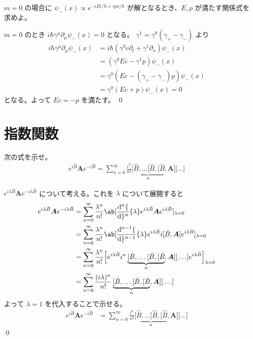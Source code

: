 \documentclass[uplatex,dvipdfmx,a4paper,11pt]{jlreq}
\makeatletter
\newcommand{\BB}{\bm{B}}
\renewcommand{\AA}{\hat{A}}
\renewcommand{\BB}{\hat{B}}
\renewcommand{\AA}{\bm{A}}
\numberwithin{equation}{section}
\theoremstyle{definition}
\renewenvironment{proof}[1][\proofname]{\par
  \normalfont
  \topsep6\p@\@plus6\p@ \trivlist
  \item[\hskip\labelsep{\bfseries #1}\@addpunct{\bfseries}]\ignorespaces\quad\par
}{%
  \qed\endtrivlist\@endpefalse
}
\renewcommand\proofname{証明}
\makeatother
\begin{document}
\begin{problem}
$m = 0$ の場合に $\psi_-(x) \propto e^{-iEt/\hbar+ipx/\hbar}$ が解となるとき、$E, p$ が満たす関係式を求めよ。
\end{problem}
\begin{proof}
  $m = 0$ のとき $i\hbar\gamma^\mu\partial_\mu\psi_-(x) = 0$ となる。 $\gamma^1 = \gamma^0(\gamma_+ - \gamma_-)$ より
  \begin{align}
    i\hbar\gamma^\mu\partial_\mu\psi_-(x) & = i\hbar(\gamma^0c\partial_t + \gamma^1\partial_x)\psi_-(x) \\
                                          & = (\gamma^0Ec - \gamma^1p)\psi_-(x)                         \\
                                          & = \gamma^0(Ec - (\gamma_+ - \gamma_-)p)\psi_-(x)            \\
                                          & = \gamma^0(Ec + p)\psi_-(x) = 0
  \end{align}
  となる。よって $Ec = -p$ を満たす。
\end{proof}

\section{指数関数}

\begin{problem}
次の式を示せ。
\begin{align}
  e^{i\BB}\AA e^{-i\BB} = \sum_{n=0}^{\infty}\frac{i^n}{n!}\underbrace{[\BB, \ldots [\BB, [\BB}_{n}, \AA]] \ldots]
\end{align}
\end{problem}
\begin{proof}
  $e^{i\lambda\BB}\AA e^{-i\lambda\BB}$ について考える。これを $\lambda$ について展開すると
  \begin{align}
    e^{i\lambda\BB}\AA e^{-i\lambda\BB} & = \sum_{n=0}^{\infty}\frac{\lambda^n}{n!}\ab[\diff[n]{}{\lambda}e^{i\lambda\BB}\AA e^{i\lambda\BB}]_{\lambda = 0}                                         \\
                                        & = \sum_{n=0}^{\infty}\frac{\lambda^n}{n!}\ab[\diff[n-1]{}{\lambda}e^{i\lambda\BB}i[\BB, \AA]e^{i\lambda\BB}]_{\lambda = 0}                                \\
                                        & = \sum_{n=0}^{\infty}\frac{\lambda^n}{n!}\Big[e^{i\lambda\BB}i^n\underbrace{[\BB, \ldots [\BB, [\BB}_{n}, \AA]] \ldots]e^{i\lambda\BB}\Big]_{\lambda = 0} \\
                                        & = \sum_{n=0}^{\infty}\frac{(i\lambda)^n}{n!}\underbrace{[\BB, \ldots [\BB, [\BB}_{n}, \AA]] \ldots]
  \end{align}
  よって $\lambda = 1$ を代入することで示せる。
  \begin{align}
    e^{i\BB}\AA e^{-i\BB} & = \sum_{n=0}^{\infty}\frac{i^n}{n!}\underbrace{[\BB, \ldots [\BB, [\BB}_{n}, \AA]] \ldots]
  \end{align}
\end{proof}
\end{document}

